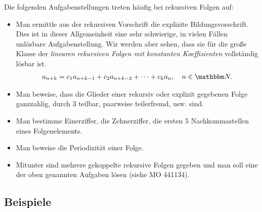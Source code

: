 \documentclass[11pt,a4paper]{article}
\begin{document}
Die folgenden Aufgabenstellungen treten häufig bei rekursiven Folgen auf:
\begin{itemize}
\item Man ermittle aus der rekursiven Vorschrift die explizite
  Bildungsvorschrift. Dies ist in dieser Allgemeinheit eine sehr schwierige, in
  vielen Fällen unlösbare Aufgabenstellung.  Wir werden aber sehen, dass sie
  für die große Klasse der \emph{linearen rekursiven Folgen mit konstanten
    Koeffizienten} vollständig lösbar ist.
\begin{align}\label{e-linrek}
a_{n+k}=c_1 a_{n+k-1} +c_2 a_{n+k-2} +\cdots + c_k a_n,\quad n\in \N.
\end{align}

\item Man beweise, dass die Glieder einer rekursiv oder explizit gegebenen
  Folge ganzzahlig, durch $3$ teilbar, paarweise teilerfremd, usw.{} sind.

\item Man bestimme Einerziffer, die Zehnerziffer, die ersten 5 Nachkommastellen
  eines Folgenelements.

\item Man beweise die Periodizität einer Folge.

\item Mitunter sind mehrere gekoppelte rekursive Folgen gegeben und man soll
  eine der oben genannten Aufgaben lösen (siehe MO 441134).
\end{itemize}

\subsection{Beispiele}
\end{document}
